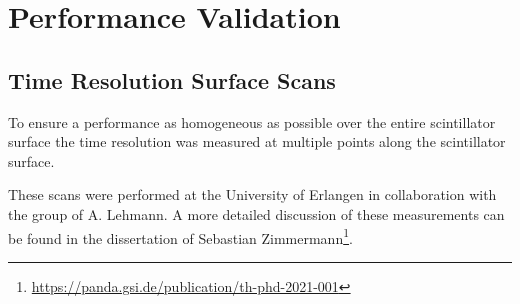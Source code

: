 \documentclass[../BTOF_summary.tex]{subfiles}
\begin{document}
\section{Performance Validation}

\subsection{Time Resolution Surface Scans}

To ensure a performance as homogeneous as possible over the entire scintillator surface the time resolution was measured at multiple points along the scintillator surface.

These scans were performed at the University of Erlangen in collaboration with the group of A. Lehmann.
A more detailed discussion of these measurements can be found in the dissertation of Sebastian Zimmermann\footnote{\url{https://panda.gsi.de/publication/th-phd-2021-001}}.
\end{document}
